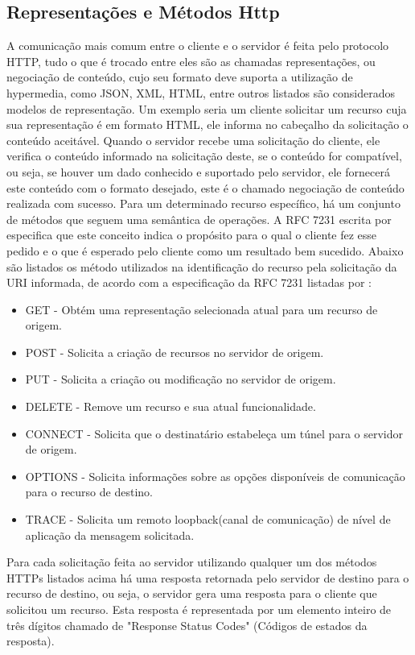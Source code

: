 \subsection{Representações e Métodos Http}
A comunicação mais comum entre o cliente e o servidor é feita pelo protocolo HTTP, tudo o que é trocado entre eles são as chamadas representações, ou negociação de conteúdo, cujo seu formato deve suporta a utilização de hypermedia, como JSON, XML, HTML, entre outros listados são considerados modelos de representação. Um exemplo seria um cliente solicitar um recurso cuja sua representação é em formato HTML, ele informa no cabeçalho da solicitação o conteúdo aceitável. Quando o servidor recebe uma solicitação do cliente, ele verifica o conteúdo informado na solicitação deste, se o conteúdo for compatível, ou seja, se houver um dado conhecido e suportado pelo servidor, ele fornecerá este conteúdo com o formato desejado, este é o chamado negociação de conteúdo realizada com sucesso. Para um determinado recurso específico, há um conjunto de métodos que seguem uma semântica de operações. A RFC 7231 escrita por \cite{rfc7231} especifica que este conceito indica o propósito para o qual o cliente fez esse pedido e o que é esperado pelo cliente como um resultado bem sucedido. Abaixo são listados os método utilizados na identificação do recurso pela solicitação da URI informada, de acordo com a especificação da RFC 7231 listadas por \cite{rfc7231}:

\begin{itemize}
\item GET - Obtém uma representação selecionada atual para um recurso de origem.
\item POST - Solicita a criação de recursos no servidor de origem.
\item PUT - Solicita a criação ou modificação no servidor de origem.
\item DELETE - Remove um recurso e sua atual funcionalidade.
\item CONNECT - Solicita que o destinatário estabeleça um túnel para o servidor de origem.
\item OPTIONS - Solicita informações sobre as opções disponíveis de comunicação para o recurso de destino.
\item TRACE - Solicita um remoto loopback(canal de comunicação) de nível de aplicação da mensagem solicitada.
\end{itemize}

Para cada solicitação feita ao servidor utilizando qualquer um dos métodos HTTPs listados acima há uma resposta retornada pelo servidor de destino para o recurso de destino, ou seja, o servidor gera uma resposta para o cliente que solicitou um recurso. Esta resposta é representada por um elemento inteiro de três dígitos chamado de "Response Status Codes" (Códigos de estados da resposta). 

